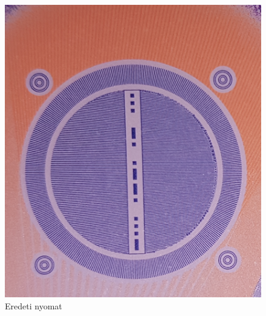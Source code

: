 \begin{figure}[h]
	
	
	\begin{minipage}[c]{0.5\linewidth}
		\centering
		\includegraphics[width=\textwidth]{img/eredeti-pelda.png}
		\caption{Eredeti nyomat}
		\label{fig:eredeti.pelda}
		

\end{minipage}
\end{figure}
